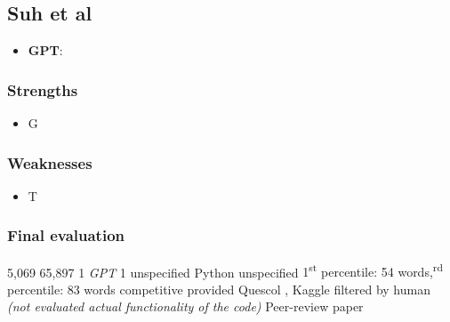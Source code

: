 \subsection{Suh et al}



\begin{itemize}
    \item \textbf{GPT}: 
\end{itemize}


\subsubsection*{Strengths}
\begin{itemize}
    \item G
\end{itemize}


\subsubsection*{Weaknesses}
\begin{itemize}
    \item T
\end{itemize}


\subsubsection*{Final evaluation}


\expandafter\def\csname Suh-et-alHumanCode\endcsname{5,069}
\expandafter\def\csname Suh-et-alLLMCode\endcsname{65,897}
\expandafter\def\csname Suh-et-alNumLLMs\endcsname{1 \textit{GPT}}
\expandafter\def\csname Suh-et-alLLMDiversity\endcsname{1}
\expandafter\def\csname Suh-et-alCurrentUse\endcsname{unspecified}
\expandafter\def\csname Suh-et-alLanguages\endcsname{Python}
\expandafter\def\csname Suh-et-alCodeTypes\endcsname{unspecified}
\expandafter\def\csname Suh-et-alCodeSize\endcsname{1\textsuperscript{st} percentile: 54 words,\textsuperscript{rd} percentile: 83 words}
\expandafter\def\csname Suh-et-alCodeContext\endcsname{competitive}
\expandafter\def\csname Suh-et-alPrompts\endcsname{provided}
\expandafter\def\csname Suh-et-alSources\endcsname{ Quescol \cite{quescol2023}, Kaggle \cite{wikipediaKaggle2023}}
\expandafter\def\csname Suh-et-alCodeQuality\endcsname{filtered by human \textit{(not evaluated
actual functionality of the code)}}
\expandafter\def\csname Suh-et-alReliability\endcsname{Peer-review paper}




